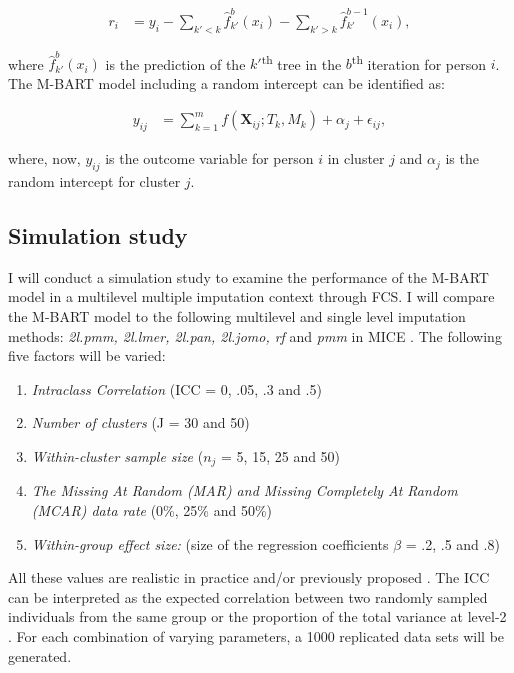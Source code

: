 \documentclass[10pt, a4paper, titlepage]{article}
\begin{document}
\begin{subequations}
\label{eq:partialresiduals}
\begin{align}
r_i &= y_i - \sum_{k' < k} \hat{f}^{b}_{k'}(x_{i}) - \sum_{k' > k} \hat{f}^{b-1}_{k'}(x_{i}), \tag{2}
\end{align}
\end{subequations}

where $\hat{f}^{b}_{k'}(x_{i})$ is the prediction of the $k'$\textsuperscript{th} tree in the $b$\textsuperscript{th} iteration for person $i$. The M-BART model including a random intercept can be identified as:

\begin{subequations}
\label{eq:M-BART}
\begin{align}
y_{ij} &= \sum_{k=1}^{m} f(\textbf{X}_{ij}; T_{k}, M_{k}) + \alpha_{j} + \epsilon_{ij}, \tag{3}
\end{align}
\end{subequations}

where, now, $y_{ij}$ is the outcome variable for person $i$ in cluster $j$ and $\alpha_{j}$ is the random intercept for cluster $j$.

\subsection{Simulation study}
I will conduct a simulation study to examine the performance of the M-BART model in a multilevel multiple imputation context through FCS. I will compare the M-BART model to the following multilevel and single level imputation methods: \textit{2l.pmm, 2l.lmer, 2l.pan, 2l.jomo, rf} and \textit{pmm} in MICE \citep{buuren2011}.
The following five factors will be varied:
\begin{enumerate}
	\item \textit{Intraclass Correlation} (ICC = 0, .05, .3 and .5)
	\item \textit{Number of clusters} (J = 30 and 50)
	\item \textit{Within-cluster sample size}  ($n_{j}$ = 5, 15, 25 and 50)
	\item \textit{The Missing At Random (MAR) and Missing Completely At Random (MCAR) data rate} (0\%, 25\% and 50\%)
	\item \textit{Within-group effect size:} (size of the regression coefficients $\beta$ = .2, .5 and .8)
\end{enumerate}
All these values are realistic in practice and/or previously proposed \citep{gulliford1999, murray2003, hox2017, grund2018, enders2018a, enders2020}. The ICC can be interpreted as the expected correlation between two randomly sampled individuals from the same group or the proportion of the total variance at level-2 \citep{gulliford2005, shieh2012, hox2011}. For each combination of varying parameters, a 1000 replicated data sets will be generated.
\end{document}
